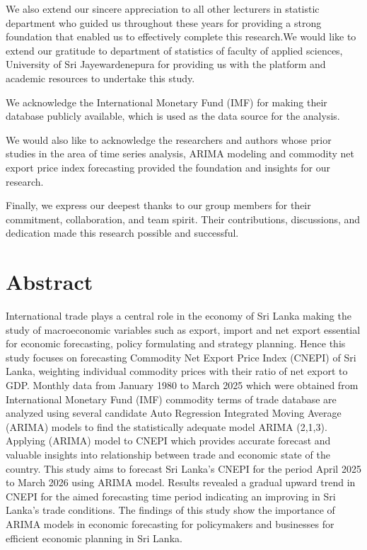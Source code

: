 \documentclass[12pt,a4paper]{report} %
\begin{document}
	We also extend our sincere appreciation to all other lecturers in statistic department who guided us throughout these years for providing a strong foundation that enabled us to effectively complete this research.We would like to extend our gratitude to department of statistics of faculty of applied sciences, University of Sri Jayewardenepura for providing us with the platform and academic resources to undertake this study.

	We acknowledge the International Monetary Fund (IMF) for making their database publicly available, which is used as the data source for the analysis.
	
	We would also like to acknowledge the researchers and authors whose prior studies in the area of time series analysis, ARIMA modeling and commodity net export price index forecasting provided the foundation and insights for our research.
	
	Finally, we express our deepest thanks to our group members for their commitment, collaboration, and team spirit. Their contributions, discussions, and dedication made this research possible and successful.
	
	
	
	
	\tableofcontents
	
	\listoffigures     %
	
	\listoftables
	
	\chapter*{Abstract} %
	
	International trade plays a central role in the economy of Sri Lanka making the study of macroeconomic variables such as export, import and net export essential for economic forecasting, policy formulating and strategy planning. Hence this study focuses on forecasting Commodity Net Export Price Index (CNEPI) of Sri Lanka, weighting individual commodity prices with their ratio of net export to GDP. Monthly data from January 1980 to March 2025 which were obtained from International Monetary Fund (IMF) commodity terms of trade database are analyzed using several candidate Auto Regression Integrated Moving Average (ARIMA) models to find the statistically adequate model ARIMA (2,1,3). Applying (ARIMA) model to CNEPI which provides accurate forecast and valuable insights into relationship between trade and economic state of the country. This study aims to forecast Sri Lanka’s CNEPI for the period April 2025 to March 2026 using ARIMA model. Results revealed a gradual upward trend in CNEPI for the aimed forecasting time period indicating an improving in Sri Lanka’s trade conditions. The findings of this study show the importance of ARIMA models in economic forecasting for policymakers and businesses for efficient economic planning in Sri Lanka.
	
\end{document}
